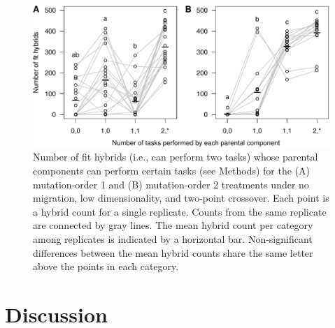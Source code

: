 \begin{doublespace}
\begin{figure}
\centering
\includegraphics[width=0.95\linewidth]{fit_hybrid_components.pdf}
\caption{Number of fit hybrids (i.e., can perform two tasks)
  whose parental components can perform certain tasks (see Methods)
  for the (A) mutation-order 1 and (B) mutation-order 2 treatments
  under no migration, low dimensionality, and two-point crossover.
  Each point is a hybrid count for a single replicate.
  Counts from the same replicate are connected by gray lines.
  The mean hybrid count per category among replicates
  is indicated by a horizontal bar.
  Non-significant differences between the mean hybrid counts
  share the same letter above the points in each category.}
\label{fit_hybrid_components}
\end{figure}







\section{Discussion}







\end{doublespace}
